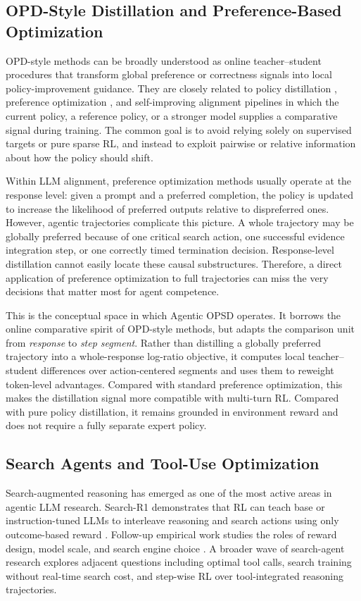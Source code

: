 \documentclass[11pt]{article}
\newcommand{\method}{Agentic OPSD}
\newcommand{\searchr}{Search-R1}
\begin{document}
\subsection{OPD-Style Distillation and Preference-Based Optimization}
OPD-style methods can be broadly understood as online teacher--student procedures that transform global preference or correctness signals into local policy-improvement guidance. They are closely related to policy distillation \citep{rusu2015policy}, preference optimization \citep{rafailov2024dpo,azar2024ipo}, and self-improving alignment pipelines in which the current policy, a reference policy, or a stronger model supplies a comparative signal during training. The common goal is to avoid relying solely on supervised targets or pure sparse RL, and instead to exploit pairwise or relative information about how the policy should shift.

Within LLM alignment, preference optimization methods usually operate at the response level: given a prompt and a preferred completion, the policy is updated to increase the likelihood of preferred outputs relative to dispreferred ones. However, agentic trajectories complicate this picture. A whole trajectory may be globally preferred because of one critical search action, one successful evidence integration step, or one correctly timed termination decision. Response-level distillation cannot easily locate these causal substructures. Therefore, a direct application of preference optimization to full trajectories can miss the very decisions that matter most for agent competence.

This is the conceptual space in which \method{} operates. It borrows the online comparative spirit of OPD-style methods, but adapts the comparison unit from \emph{response} to \emph{step segment}. Rather than distilling a globally preferred trajectory into a whole-response log-ratio objective, it computes local teacher--student differences over action-centered segments and uses them to reweight token-level advantages. Compared with standard preference optimization, this makes the distillation signal more compatible with multi-turn RL. Compared with pure policy distillation, it remains grounded in environment reward and does not require a fully separate expert policy.

\subsection{Search Agents and Tool-Use Optimization}
Search-augmented reasoning has emerged as one of the most active areas in agentic LLM research. \searchr{} demonstrates that RL can teach base or instruction-tuned LLMs to interleave reasoning and search actions using only outcome-based reward \citep{jin2025search}. Follow-up empirical work studies the roles of reward design, model scale, and search engine choice \citep{jin2025empirical}. A broader wave of search-agent research explores adjacent questions including optimal tool calls, search training without real-time search cost, and step-wise RL over tool-integrated reasoning trajectories.
\end{document}
